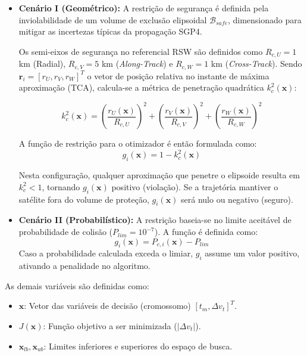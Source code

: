\begin{itemize}
    \item \textbf{Cenário I (Geométrico):} A restrição de segurança é definida pela inviolabilidade de um volume de exclusão elipsoidal $\mathcal{B}_{safe}$, dimensionado para mitigar as incertezas típicas da propagação SGP4.
    
    Os semi-eixos de segurança no referencial RSW são definidos como $R_{c,U}=1$ km (Radial), $R_{c,V}=5$ km (\textit{Along-Track}) e $R_{c,W}=1$ km (\textit{Cross-Track}). Sendo $\mathbf{r}_i = [r_U, r_V, r_W]^T$ o vetor de posição relativa no instante de máxima aproximação (TCA), calcula-se a métrica de penetração quadrática $k_c^2(\mathbf{x})$:
    
    \begin{equation}
        k_c^2(\mathbf{x}) = \left(\frac{r_U(\mathbf{x})}{R_{c,U}}\right)^2 + \left(\frac{r_V(\mathbf{x})}{R_{c,V}}\right)^2 + \left(\frac{r_W(\mathbf{x})}{R_{c,W}}\right)^2
    \end{equation}

    A função de restrição para o otimizador é então formulada como:
    \begin{equation}
        g_i(\mathbf{x}) = 1 - k_c^2(\mathbf{x})
    \end{equation}
    
    Nesta configuração, qualquer aproximação que penetre o elipsoide resulta em $k_c^2 < 1$, tornando $g_i(\mathbf{x})$ positivo (violação). Se a trajetória mantiver o satélite fora do volume de proteção, $g_i(\mathbf{x})$ será nulo ou negativo (seguro).

    \item \textbf{Cenário II (Probabilístico):} A restrição baseia-se no limite aceitável de probabilidade de colisão ($P_{lim} = 10^{-7}$). A função é definida como:
    \begin{equation}
        g_i(\mathbf{x}) = P_{c, i}(\mathbf{x}) - P_{lim}
    \end{equation}
    Caso a probabilidade calculada exceda o limiar, $g_i$ assume um valor positivo, ativando a penalidade no algoritmo.
\end{itemize}

As demais variáveis são definidas como:
\begin{itemize}
    \item $\mathbf{x}$: Vetor das variáveis de decisão (cromossomo) $[t_m, \Delta v_t]^T$.
    \item $J(\mathbf{x})$: Função objetivo a ser minimizada ($|\Delta v_t|$).
    \item $\mathbf{x}_{lb}, \mathbf{x}_{ub}$: Limites inferiores e superiores do espaço de busca.
\end{itemize}

